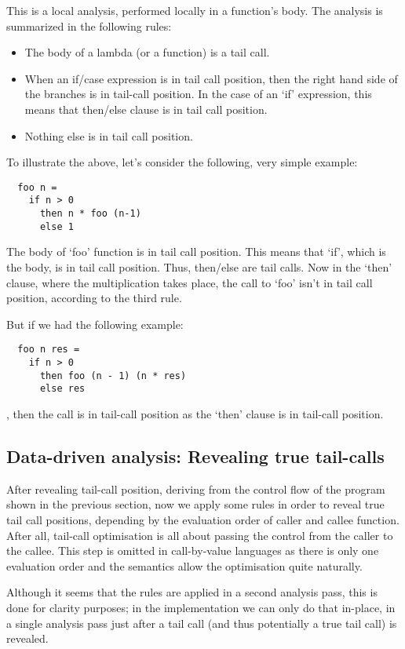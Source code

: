 \documentclass[diploma]{softlab-thesis}
\begin{document}
This is a local analysis, performed locally in a function's body. The analysis is summarized in the following rules:
\begin{itemize}
  \item The body of a lambda (or a function) is a tail call.
  \item When an if/case expression is in tail call position, then the right hand side of the branches is in tail-call position. 
  In the case of an `if' expression, this means that then/else clause is in tail call position.
  \item Nothing else is in tail call position.
\end{itemize}

To illustrate the above, let's consider the following, very simple example:
\begin{verbatim}
  foo n = 
    if n > 0  
      then n * foo (n-1) 
      else 1
\end{verbatim}

The body of `foo' function is in tail call position. This means that `if', which is the body, is in tail call position. 
Thus, then/else are tail calls. Now in the `then' clause, where the multiplication takes place, the call to `foo' isn't in tail call position, 
according to the third rule.

But if we had the following example:
\begin{verbatim}
  foo n res = 
    if n > 0 
      then foo (n - 1) (n * res)
      else res
\end{verbatim}
, then the call is in tail-call position as the `then' clause is in tail-call position.

\subsection{Data-driven analysis: Revealing true tail-calls}

After revealing tail-call position, deriving from the control flow of the program shown in the previous section, now we apply some rules in order to 
reveal true tail call positions, depending by the evaluation order of caller and callee function. After all, tail-call optimisation 
is all about passing the control from the caller to the callee. This step is omitted in call-by-value languages as there is 
only one evaluation order and the semantics allow the optimisation quite naturally.

Although it seems that the rules are applied in a second analysis pass, this is done for clarity purposes; in the implementation we can 
only do that in-place, in a single analysis pass just after a tail call (and thus potentially a true tail call) is revealed.
\end{document}
